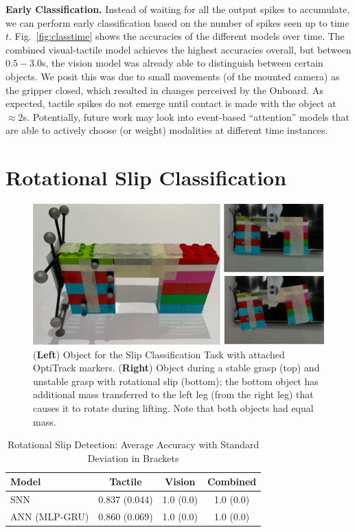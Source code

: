 \documentclass[fyp]{socreport}
\begin{document}
\noindent\textbf{Early Classification.} Instead of waiting for all the output
spikes to accumulate, we can perform early classification based on the number of
spikes seen up to time $t$. Fig.~\ref{fig:classtime} shows the accuracies of the
different models over time. The combined visual-tactile model achieves the
highest accuracies overall, but between $0.5-3.0$s, the vision model was already
able to distinguish between certain objects. We posit this was due to small
movements (of the mounted camera) as the gripper closed, which resulted in
changes perceived by the Onboard. As expected, tactile spikes do not emerge
until contact is made with the object at $\approx 2$s. Potentially, future work
may look into event-based ``attention'' models that are able to actively choose
(or weight) modalities at different time instances.

\section{Rotational Slip Classification\label{sec:slippage}}

\begin{figure}
\centering
\includegraphics[width=0.65\columnwidth]{images/robotsetup/objects_exp2_small.png}
\caption{(\textbf{Left}) Object for the Slip Classification Task with attached
  OptiTrack markers. (\textbf{Right}) Object during a stable grasp (top) and
  unstable grasp with rotational slip (bottom); the bottom object has additional
  mass transferred to the left leg (from the right leg) that causes it to rotate
  during lifting. Note that both objects had equal
  mass.\label{img:slips}}
\end{figure}

\begin{table}
\centering
\caption{Rotational Slip Detection: Average Accuracy with Standard Deviation in
  Brackets\label{tbl:sdacc}}
\begin{tabular}{lccc}
 \toprule
  \textbf{Model} & \textbf{Tactile} & \textbf{Vision} & \textbf{Combined} \\
 \midrule
 SNN & 0.837 (0.044)  & 1.0 (0.0) & 1.0 (0.0) \\
 ANN (MLP-GRU) & 0.860 (0.069) & 1.0 (0.0)  & 1.0 (0.0) \\
 \bottomrule
\end{tabular}
\end{table}
\end{document}
